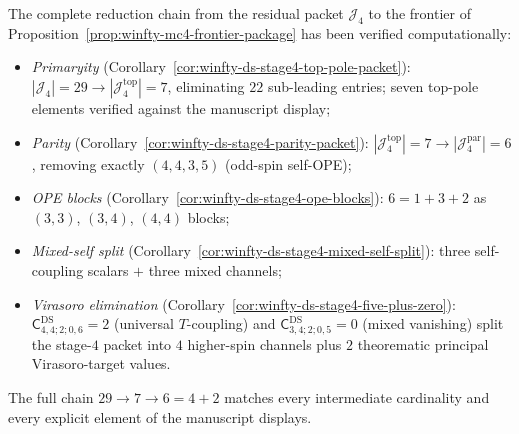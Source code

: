 \begin{computation}
\label{comp:winfty-stage4-reduction-chain}
The complete reduction chain from the residual packet
$\mathcal{J}_4$ to the frontier of
Proposition~\ref{prop:winfty-mc4-frontier-package} has been
verified computationally:
\begin{itemize}
\item \emph{Primaryity}
  (Corollary~\ref{cor:winfty-ds-stage4-top-pole-packet}):
  $|\mathcal{J}_4| = 29 \to |\mathcal{J}_4^{\mathrm{top}}| = 7$,
  eliminating $22$ sub-leading entries; seven top-pole elements
  verified against the manuscript display;
\item \emph{Parity}
  (Corollary~\ref{cor:winfty-ds-stage4-parity-packet}):
  $|\mathcal{J}_4^{\mathrm{top}}| = 7
  \to |\mathcal{J}_4^{\mathrm{par}}| = 6$,
  removing exactly $(4,4,3,5)$ (odd-spin self-OPE);
\item \emph{OPE blocks}
  (Corollary~\ref{cor:winfty-ds-stage4-ope-blocks}):
  $6 = 1 + 3 + 2$ as $(3,3)$, $(3,4)$, $(4,4)$ blocks;
\item \emph{Mixed-self split}
  (Corollary~\ref{cor:winfty-ds-stage4-mixed-self-split}):
  three self-coupling scalars $+$ three mixed channels;
\item \emph{Virasoro elimination}
  (Corollary~\ref{cor:winfty-ds-stage4-five-plus-zero}):
  $\mathsf{C}^{\mathrm{DS}}_{4,4;2;0,6} = 2$ (universal $T$-coupling)
  and $\mathsf{C}^{\mathrm{DS}}_{3,4;2;0,5} = 0$ (mixed vanishing)
  split the stage-$4$ packet into $4$ higher-spin channels plus
  $2$ theorematic principal Virasoro-target values.
\end{itemize}
The full chain $29 \to 7 \to 6 = 4 + 2$ matches every intermediate
cardinality and every explicit element of the manuscript displays.
\end{computation}

